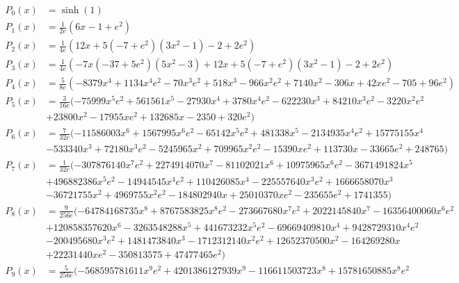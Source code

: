 \documentclass{article}
\begin{document}
    \begin{align*}
    	P_0(x) &= \sinh{\left(1 \right)}\\
    	P_1(x) &= \frac{1}{2 e}(6 x - 1 + e^{2}) \\
    	P_2(x) &= \frac{1}{4 e}(12 x + 5 \left(-7 + e^{2}\right) \left(3 x^{2} - 1\right) - 2 + 2 e^{2})\\
    	P_3(x) &=\frac{1}{4 e}(- 7 x \left(-37 + 5 e^{2}\right) \left(5 x^{2} - 3\right) + 12 x + 5 \left(-7 + e^{2}\right) \left(3 x^{2} - 1\right) - 2 + 2 e^{2})\\
    	P_4(x) &=\frac{5}{8 e}(- 8379 x^{4} + 1134 x^{4} e^{2} - 70 x^{3} e^{2} + 518 x^{3} - 966 x^{2} e^{2} + 7140 x^{2} - 306 x + 42 x e^{2} - 705 + 96 e^{2})\\
    	P_5(x) &=\frac{3}{16 e} (- 75999 x^{5} e^{2} + 561561 x^{5} - 27930 x^{4} + 3780 x^{4} e^{2} - 622230 x^{3} + 84210 x^{3} e^{2} - 3220 x^{2} e^{2} \\
    	&+ 23800 x^{2} - 17955 x e^{2} + 132685 x - 2350 + 320 e^{2})\\
    	P_6(x) &= \frac{7}{32 e} (- 11586003 x^{6} + 1567995 x^{6} e^{2} - 65142 x^{5} e^{2} + 481338 x^{5} - 2134935 x^{4} e^{2} + 15775155 x^{4} \\
    	&- 533340 x^{3} + 72180 x^{3} e^{2} - 5245965 x^{2} + 709965 x^{2} e^{2} - 15390 x e^{2} + 113730 x - 33665 e^{2} + 248765)\\
    	P_7(x) &= \frac{1}{32 e}(- 307876140 x^{7} e^{2} + 2274914070 x^{7} - 81102021 x^{6} + 10975965 x^{6} e^{2} - 3671491824 x^{5}\\
    	& + 496882386 x^{5} e^{2} - 14944545 x^{4} e^{2} + 110426085 x^{4} - 225557640 x^{3} e^{2} + 1666658070 x^{3}\\
    	&- 36721755 x^{2} + 4969755 x^{2} e^{2} - 184802940 x + 25010370 x e^{2} - 235655 e^{2} + 1741355)\\
    	P_8(x) &= \frac{9}{256 e}(- 64784168735 x^{8} + 8767583825 x^{8} e^{2} - 273667680 x^{7} e^{2} + 2022145840 x^{7} - 16356400060 x^{6} e^{2}\\
    	& +120858357620 x^{6} - 3263548288 x^{5} + 441673232 x^{5} e^{2} - 69669409810 x^{4} + 9428729310 x^{4} e^{2}\\
    	& - 200495680 x^{3} e^{2} + 1481473840 x^{3} - 1712312140 x^{2} e^{2} + 12652370500 x^{2} - 164269280 x\\
    	& + 22231440 x e^{2} - 350813575 + 47477465 e^{2})\\
    	P_9(x) &=\frac{5 }{256 e}(- 568595781611 x^{9} e^{2} + 4201386127939 x^{9} - 116611503723 x^{8} + 15781650885 x^{8} e^{2}\\

\end{align*}
\end{document}
